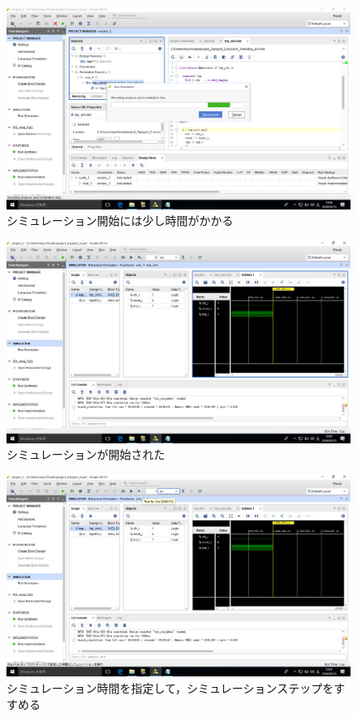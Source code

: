 \documentclass[a4paper,dvipdfmx]{jsarticle}
\begin{document}
 \begin{figure}[H]
  \begin{center}
   \includegraphics[width=.8\textwidth]{chapter04_figures/VirtualBox_Windows10_19_03_2018_12_06_45.png}
  \end{center}
  \caption{シミュレーション開始には少し時間がかかる}
 \end{figure}

 \begin{figure}[H]
  \begin{center}
   \includegraphics[width=.8\textwidth]{chapter04_figures/VirtualBox_Windows10_19_03_2018_12_07_37.png}
  \end{center}
  \caption{シミュレーションが開始された}
 \end{figure}

 \begin{figure}[H]
  \begin{center}
   \includegraphics[width=.8\textwidth]{chapter04_figures/VirtualBox_Windows10_19_03_2018_12_07_58.png}
  \end{center}
  \caption{シミュレーション時間を指定して，シミュレーションステップをすすめる}
 \end{figure}
\end{document}
